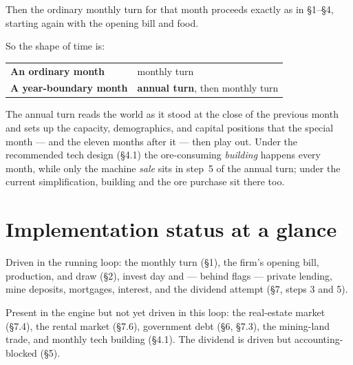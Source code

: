 \documentclass[11pt]{article}
\begin{document}
Then the ordinary monthly turn for that month proceeds exactly as in \S1--\S4,
starting again with the opening bill and food.

\medskip
\noindent So the shape of time is:
\begin{center}
\begin{tabular}{@{}ll@{}}
\toprule
\textbf{An ordinary month} & monthly turn \\
\textbf{A year-boundary month} & \textbf{annual turn}, then monthly turn \\
\bottomrule
\end{tabular}
\end{center}

\noindent The annual turn reads the world as it stood at the close of the previous
month and sets up the capacity, demographics, and capital positions that the
special month --- and the eleven months after it --- then play out. Under the
recommended tech design (\S4.1) the ore-consuming \emph{building} happens every
month, while only the machine \emph{sale} sits in step~5 of the annual turn;
under the current simplification, building and the ore purchase sit there too.

\section{Implementation status at a glance}

Driven in the running loop: the monthly turn (\S1), the firm's opening bill,
production, and draw (\S2), invest day and --- behind flags --- private lending,
mine deposits, mortgages, interest, and the dividend attempt (\S7, steps 3 and 5).

Present in the engine but not yet driven in this loop: the real-estate market
(\S7.4), the rental market (\S7.6), government debt (\S6, \S7.3), the mining-land
trade, and monthly tech building (\S4.1). The dividend is driven but
accounting-blocked (\S5).
\end{document}
